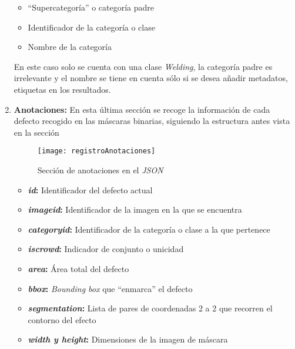 \begin{enumerate}
    \begin{itemize}
        \item ``Supercategoría'' o categoría padre
        \item Identificador de la categoría o clase
        \item Nombre de la categoría
    \end{itemize}
        
    En este caso solo se cuenta con una clase \emph{Welding}, la categoría padre es irrelevante y el nombre se tiene en cuenta sólo si se desea añadir metadatos, etiquetas en los resultados.
    
    \clearpage
    
    \item \textbf{Anotaciones:} En esta última sección se recoge la información de cada defecto recogido en las máscaras binarias, siguiendo la estructura antes vista en la sección 
            
    \begin{figure}[htb]
        \centering
        \texttt{[image: registroAnotaciones]}
        \caption[Sección de anotaciones en el \emph{JSON}]{Sección de anotaciones en el \emph{JSON}}
    \end{figure}
    
    \begin{itemize}
        \item \textbf{\emph{id}:} Identificador del defecto actual
        \item \textbf{\emph{image\textunderscore id}:} Identificador de la imagen en la que se encuentra
        \item \textbf{\emph{category\textunderscore id}:} Identificador de la categoría o clase a la que pertenece
        \item \textbf{\emph{iscrowd}:} Indicador de conjunto o unicidad
        \item \textbf{\emph{area}:} Área total del defecto
        \item \textbf{\emph{bbox}:} \emph{Bounding box} que ``enmarca'' el defecto
        \item \textbf{\emph{segmentation}:} Lista de pares de coordenadas 2 a 2 que recorren el contorno del efecto
        \item \textbf{\emph{width y height}:} Dimensiones de la imagen de máscara
    \end{itemize}
        
\end{enumerate}


